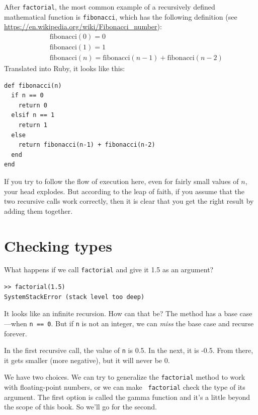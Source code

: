 \documentclass[10pt]{book}
\begin{document}
After {\tt factorial}, the most common example of a recursively
defined mathematical function is {\tt fibonacci}, which has the
following definition (see
  \url{https://en.wikipedia.org/wiki/Fibonacci_number}):
%
\begin{eqnarray*}
&& \mathrm{fibonacci}(0) = 0 \\
&& \mathrm{fibonacci}(1) = 1 \\
&& \mathrm{fibonacci}(n) = \mathrm{fibonacci}(n-1) + \mathrm{fibonacci}(n-2)
\end{eqnarray*}
%
Translated into Ruby, it looks like this:

\begin{verbatim}
def fibonacci(n)
  if n == 0
    return 0
  elsif n == 1
    return 1
  else
    return fibonacci(n-1) + fibonacci(n-2)
  end
end
\end{verbatim}
%
If you try to follow the flow of execution here, even for fairly
small values of $n$, your head explodes.  But according to the
leap of faith, if you assume that the two recursive calls
work correctly, then it is clear that you get
the right result by adding them together.


\section{Checking types}
\label{guardian}

What happens if we call {\tt factorial} and give it 1.5 as an argument?

\begin{verbatim}
>> factorial(1.5)
SystemStackError (stack level too deep)
\end{verbatim}
%
It looks like an infinite recursion.  How can that be?  The method
has a base case---when {\tt n == 0}.  But if {\tt n} is not an integer,
we can {\em miss} the base case and recurse forever.

In the first recursive call, the value of {\tt n} is 0.5.
In the next, it is -0.5.  From there, it gets smaller
(more negative), but it will never be 0.

We have two choices.  We can try to generalize the {\tt factorial}
method to work with floating-point numbers, or we can make {\tt
  factorial} check the type of its argument.  The first option is
called the gamma function and it's a
little beyond the scope of this book.  So we'll go for the second.
\end{document}
